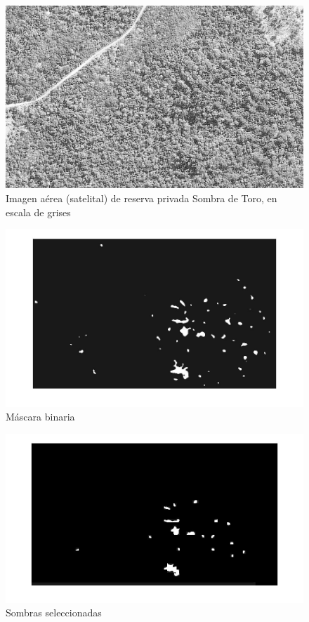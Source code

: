 
\begin{figure}[h!]
    \includegraphics[width=\textwidth]{Imagenes/Homomorfico/ST2.jpg}
     \hfill
     \caption{Imagen aérea (satelital) de reserva privada Sombra de Toro, en escala de grises}
    \label{sombratorogris}
\end{figure}

\begin{figure}[h!]
    \includegraphics[width=\textwidth]{Imagenes/Homomorfico/ST2_bin.jpg}
     \hfill
     \caption{Máscara binaria}
    \label{mascaraST}
\end{figure}

\begin{figure}[h!]
    \includegraphics[width=\textwidth]{Imagenes/Homomorfico/ST2_masked.jpg}
     \hfill
     \caption{Sombras seleccionadas}
    \label{seleccionadaST}
\end{figure}